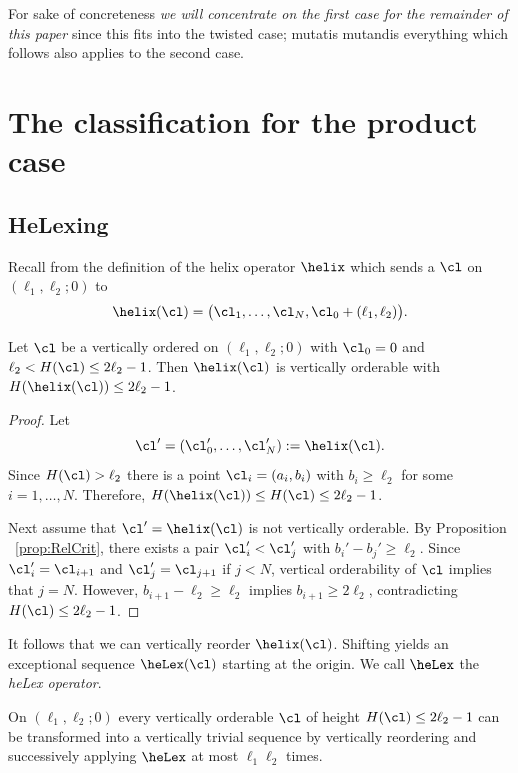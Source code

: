 For sake of concreteness {\em we will 
concentrate on the first case for the remainder 
of this paper} since this fits into the twisted case; 
mutatis mutandis everything which follows also 
applies to the second case.

\section{The classification for the 
product case}
\label{sec:ClassPC}
\subsection{HeLexing}
\label{subsec:HeLexPC}
Recall from 
the definition of the helix operator 
$\helix$ which sends a {\mes} $\cl$ on 
$(\ell_1,\ell_2;0)$ to
$$
\helix(\cl)=\big(\cl_1,\ldots,\cl_N,\cl_0+
(\ell_1,\ell_2)\big).
$$

\begin{lemma}
Let $\cl$ be a vertically ordered {\mes} on 
$(\ell_1,\ell_2;0)$ with $\cl_0=0$ and 
$\ell_2<H(\cl)\leq2\ell_2-1$. Then $\helix(\cl)$ 
is vertically orderable with $H(\helix(\cl))\leq2\ell_2-1$.
\end{lemma}

\begin{proof}
Let
$$
\cl'=(\cl_0',\ldots,\cl_N'):=\helix(\cl).
$$
Since $H(\cl)>\ell_2$ there is a point 
$\cl_i=(a_i,b_i)$ with $b_i\geq\ell_2$ for 
some $i=1,\ldots,N$. Therefore, $H(\helix(\cl))
\leq H(\cl)\leq2\ell_2-1$.

Next assume that $\cl'=\helix(\cl)$ is not
vertically orderable. By Proposition
~\ref{prop:RelCrit}, there exists a pair 
$\cl_i'<\cl_j'$ with $b_i'-b_j'\geq\ell_2$. 
Since $\cl_i'=\cl_{i+1}$ and $\cl_j'=\cl_{j+1}$ 
if $j<N$, vertical orderability of $\cl$ 
implies that $j=N$. However, 
$b_{i+1}-\ell_2\geq\ell_2$ implies 
$b_{i+1}\geq2\ell_2$, contradicting 
$H(\cl)\leq2\ell_2-1$.
\end{proof}

It follows that we can vertically reorder 
$\helix(\cl)$. Shifting yields an exceptional
sequence $\heLex(\cl)$ starting at the origin.
We call $\heLex$ the {\em heLex operator}.

\begin{theorem}
\label{thm:HeLexingPC}
On $(\ell_1,\ell_2;0)$ every vertically 
orderable {\mes} $\cl$ of height 
$H(\cl)\leq 2\ell_2-1$ can be transformed 
into a vertically trivial sequence by 
vertically reordering and successively 
applying $\heLex$ 
at most $\ell_1\ell_2$ times.
\end{theorem}

